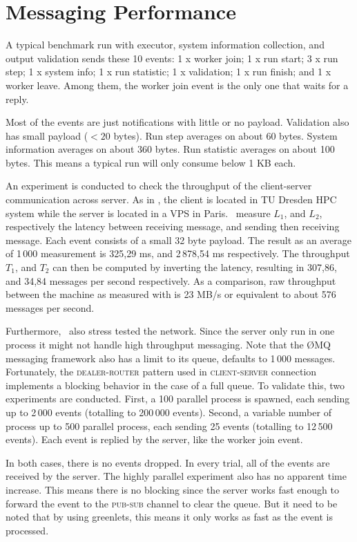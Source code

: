 \section{Messaging Performance}
\label{sec:eval.messaging}

A typical benchmark run with executor, system information collection, and output validation sends these 10 events:
1 x worker join;
1 x run start;
3 x run step;
1 x system info;
1 x run statistic;
1 x validation;
1 x run finish; and
1 x worker leave.
Among them, the worker join event is the only one that waits for a reply.

Most of the events are just notifications with little or no payload.
Validation also has small payload ($< 20$ bytes).
Run step averages on about 60 bytes.
System information averages on about 360 bytes.
Run statistic averages on about 100 bytes.
This means a typical run will only consume below 1 KB each.

An experiment is conducted to check the throughput of the client-server communication across server.
As in , the client is located in TU Dresden HPC system while the server is located in a VPS in Paris.
\First~measure \(L_1\), and \(L_2\), respectively the latency between receiving message, and sending then receiving message.
Each event consists of a small 32 byte payload.
The result as an average of 1\,000 measurement is 325,29 ms, and 2\,878,54 ms respectively.
The throughput \(T_1\), and \(T_2\) can then be computed by inverting the latency, resulting in 307,86, and 34,84 messages per second respectively.
As a comparison, raw throughput between the machine as measured with  is 23 MB/s or equivalent to about 576 messages per second.

Furthermore, \first~also stress tested the network.
Since the server only run in one process it might not handle high throughput messaging.
Note that the \O MQ messaging framework also has a limit to its queue, defaults to 1\,000 messages.
Fortunately, the \textsc{dealer-router} pattern used in \textsc{client}-\textsc{server} connection implements a blocking behavior in the case of a full queue.
To validate this, two experiments are conducted.
First, a 100 parallel process is spawned, each sending up to 2\,000 events (totalling to 200\,000 events).
Second, a variable number of process up to 500 parallel process, each sending 25 events (totalling to 12\,500 events).
Each event is replied by the server, like the worker join event.

In both cases, there is no events dropped.
In every trial, all of the events are received by the server.
The highly parallel experiment also has no apparent time increase.
This means there is no blocking since the server works fast enough to forward the event to the \textsc{pub}-\textsc{sub} channel to clear the queue.
But it need to be noted that by using greenlets, this means it only works as fast as the event is processed.


